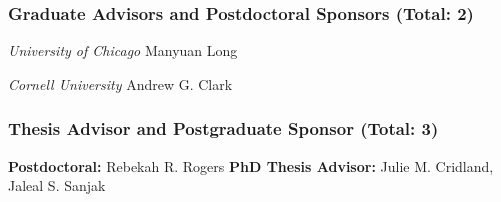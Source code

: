 \documentclass[10pt]{article}
\begin{document}
\subsubsection*{Graduate Advisors and Postdoctoral Sponsors (Total: 2)}

\emph{University of Chicago} Manyuan Long

\emph{Cornell University} Andrew G. Clark

\subsubsection*{Thesis Advisor and Postgraduate Sponsor (Total: 3)}
\textbf{Postdoctoral: } Rebekah R. Rogers
\textbf{PhD Thesis Advisor:} Julie M. Cridland, Jaleal S. Sanjak
\end{document}
